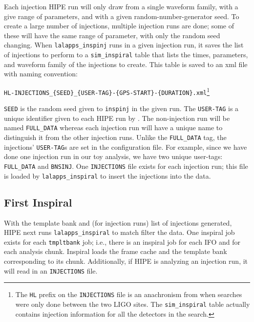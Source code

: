 Each injection \ac{HIPE} run will only draw from a single waveform family, with a give range of parameters, and with a given random-number-generator seed. To create a large number of injections, multiple injection runs are done; some of these will have the same range of parameter, with only the random seed changing. When \texttt{lalapps\_inspinj} runs in a given injection run, it saves the list of injections to perform to a \texttt{sim\_inspiral} table that lists the times, parameters, and waveform family of the injections to create. This table is saved to an xml file with naming convention:
\begin{center}
\texttt{HL-INJECTIONS\_\{SEED\}\_\{USER-TAG\}-\{GPS-START\}-\{DURATION\}.xml}\footnote{The \texttt{HL} prefix on the \texttt{INJECTIONS} file is an anachronism from when searches were only done between the two \ac{LIGO} sites. The \texttt{sim\_inspiral} table actually contains injection information for all the detectors in the search.}
\end{center}
\texttt{SEED} is the random seed given to \texttt{inspinj} in the given run. The \texttt{USER-TAG} is a unique identifier given to each \ac{HIPE} run by \ihope. The non-injection run will be named \texttt{FULL\_DATA} whereas each injection run will have a unique name to distinguish it from the other injection runs. Unlike the \texttt{FULL\_DATA} tag, the injections' \texttt{USER-TAG}s are set in the configuration file. For example, since we have done one injection run in our toy analysis, we have two unique user-tags: \texttt{FULL\_DATA} and \texttt{BNSINJ}. One \texttt{INJECTIONS} file exists for each injection run; this file is loaded by \texttt{lalapps\_inspiral} to insert the injections into the data.


\subsection{First Inspiral}
\label{sec:first_inspiral}

With the template bank and (for injection runs) list of injections generated, \ac{HIPE} next runs \texttt{lalapps\_inspiral} to match filter the data. One inspiral job exists for each \texttt{tmpltbank} job; i.e., there is an inspiral job for each \ac{IFO} and for each analysis chunk. Inspiral loads the frame cache and the template bank corresponding to its chunk. Additionally, if \ac{HIPE} is analyzing an injection run, it will read in an \texttt{INJECTIONS} file.

